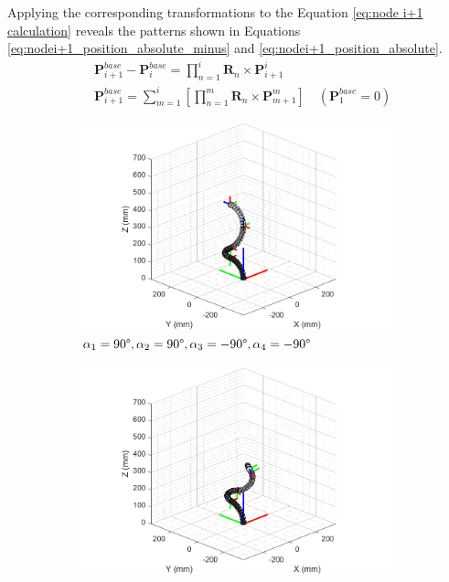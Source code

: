 Applying the corresponding transformations to the Equation \ref{eq:node i+1 calculation} reveals the patterns shown 
in Equations \ref{eq:nodei+1_position_absolute_minus} and \ref{eq:nodei+1_position_absolute}.
\begin{align}
    &\textbf{P}_{i+1}^{base} - \textbf{P}_{i}^{base} = \prod_{n=1}^{i}\textbf{R}_{n}\times \textbf{P}_{i+1}^{i} 
    \label{eq:nodei+1_position_absolute_minus} \\
    &\textbf{P}_{i+1}^{base} = \sum_{m=1}^{i}\left[\prod_{n=1}^{m}\textbf{R}_{n}\times \textbf{P}_{m+1}^{m}\right] \quad(\textbf{P}_{1}^{base} = 0)
    \label{eq:nodei+1_position_absolute}
\end{align}

\begin{figure}[H] %
    \centering %
    \captionsetup{labelsep=colon}
    \begin{subfigure}{0.85\textwidth} %
        \centering
        \includegraphics[width=\linewidth]{Image/MATLAB/manipulator_90_90_-90_-90.png}
        \caption{$\alpha_1=90\degree,\alpha_2=90\degree,\alpha_3=-90\degree,\alpha_4=-90\degree$}
    \end{subfigure}
    \hfill
    \begin{subfigure}{0.85\textwidth} %
        \centering
        \includegraphics[width=\linewidth]{Image/MATLAB/manipulator_80_120_-120_90.png}

\end{subfigure}
\end{figure}
